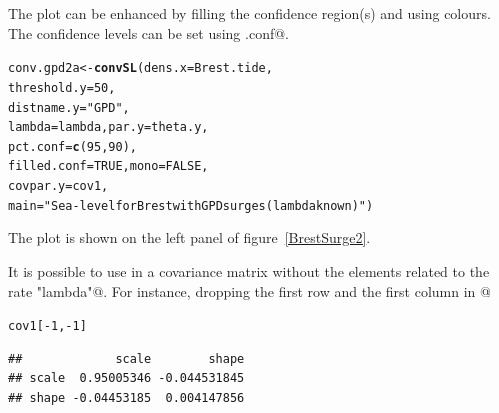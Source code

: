 \documentclass[11pt,a4paper]{report}\usepackage[]{graphicx}\usepackage[]{color}
\makeatletter
\newcommand{\hlnum}[1]{\textcolor[rgb]{0.686,0.059,0.569}{#1}}%
\newcommand{\hlstr}[1]{\textcolor[rgb]{0.192,0.494,0.8}{#1}}%
\newcommand{\hlopt}[1]{\textcolor[rgb]{0,0,0}{#1}}%
\newcommand{\hlstd}[1]{\textcolor[rgb]{0.345,0.345,0.345}{#1}}%
\newcommand{\hlkwb}[1]{\textcolor[rgb]{0.69,0.353,0.396}{#1}}%
\newcommand{\hlkwc}[1]{\textcolor[rgb]{0.333,0.667,0.333}{#1}}%
\newcommand{\hlkwd}[1]{\textcolor[rgb]{0.737,0.353,0.396}{\textbf{#1}}}%
\newenvironment{kframe}{%
 \def\at@end@of@kframe{}%
 \ifinner\ifhmode%
  \def\at@end@of@kframe{\end{minipage}}%
  \begin{minipage}{\columnwidth}%
 \fi\fi%
 \def\FrameCommand##1{\hskip\@totalleftmargin \hskip-\fboxsep
 \colorbox{shadecolor}{##1}\hskip-\fboxsep
     \hskip-\linewidth \hskip-\@totalleftmargin \hskip\columnwidth}%
 \MakeFramed {\advance\hsize-\width
   \@totalleftmargin\z@ \linewidth\hsize
   \@setminipage}}%
 {\par\unskip\endMakeFramed%
 \at@end@of@kframe}
\newenvironment{knitrout}{}{} %
\makeatother
\begin{document}
The plot can be enhanced by filling the confidence region(s) and
using colours. The confidence levels can be set using \verb@pct.conf@.

\begin{knitrout}
\color{fgcolor}\begin{kframe}
\begin{alltt}
\hlstd{conv.gpd2a} \hlkwb{<-} \hlkwd{convSL}\hlstd{(}\hlkwc{dens.x} \hlstd{= Brest.tide,}
                     \hlkwc{threshold.y} \hlstd{=} \hlnum{50}\hlstd{,}
                     \hlkwc{distname.y} \hlstd{=} \hlstr{"GPD"}\hlstd{,}
                     \hlkwc{lambda} \hlstd{= lambda,} \hlkwc{par.y} \hlstd{= theta.y,}
                     \hlkwc{pct.conf} \hlstd{=} \hlkwd{c}\hlstd{(}\hlnum{95}\hlstd{,} \hlnum{90}\hlstd{),}
                     \hlkwc{filled.conf} \hlstd{=} \hlnum{TRUE}\hlstd{,} \hlkwc{mono} \hlstd{=} \hlnum{FALSE}\hlstd{,}
                     \hlkwc{covpar.y} \hlstd{= cov1,}
                     \hlkwc{main} \hlstd{=} \hlstr{"Sea-level for Brest with GPD surges (lambda known)"}\hlstd{)}
\end{alltt}
\end{kframe}
\end{knitrout}

\noindent
The plot is shown on the left panel of figure~\ref{BrestSurge2}.

It is possible to use in \verb@convSL@ a covariance matrix without the
elements related to the rate \verb@"lambda"@. For instance, dropping
the first row and the first column in @

\begin{knitrout}
\color{fgcolor}\begin{kframe}
\begin{alltt}
\hlstd{cov1[}\hlopt{-}\hlnum{1}\hlstd{,} \hlopt{-}\hlnum{1}\hlstd{]}
\end{alltt}
\begin{verbatim}
##             scale        shape
## scale  0.95005346 -0.044531845
## shape -0.04453185  0.004147856
\end{verbatim}
\end{kframe}
\end{knitrout}
\end{document}
